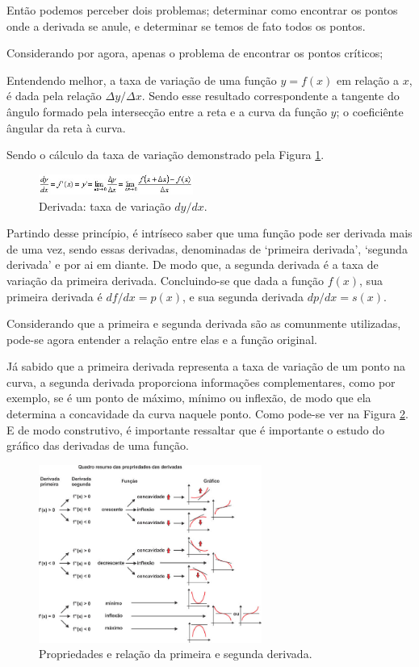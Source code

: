 Então podemos perceber dois problemas; determinar como encontrar os pontos onde
a derivada se anule, e determinar se temos de fato todos os pontos.

Considerando por agora, apenas o problema de encontrar os pontos críticos;

Entendendo melhor, a taxa de variação de uma função \(y=f(x)\) em relação a
\(x\), é dada pela relação \(\Delta y / \Delta x\). Sendo esse resultado
correspondente a tangente do ângulo formado pela intersecção entre a reta e a
curva da função \(y\); o coeficiênte ângular da reta à curva.

Sendo o cálculo da taxa de variação demonstrado pela Figura
\ref{derivada_padrao}.

\begin{figure}[h]
    \includegraphics[width=0.45\textwidth]
        {src/derivada_padrao.jpg}
    \centering
    \caption{Derivada: taxa de variação \(dy/dx\).}
    \label{derivada_padrao}
\end{figure}

Partindo desse princípio, é intríseco saber que uma função pode ser derivada
mais de uma vez, sendo essas derivadas, denominadas de `primeira derivada',
`segunda derivada' e por ai em diante. De modo que, a segunda derivada é
a taxa de variação da primeira derivada. Concluindo-se que dada a função
\(f(x)\), sua primeira derivada é \(df/dx = p(x)\), e sua segunda derivada
\(dp/dx = s(x)\).

Considerando que a primeira e segunda derivada são as comunmente utilizadas,
pode-se agora entender a relação entre elas e a função original.

Já sabido que a primeira derivada representa a taxa de variação de um ponto na
curva, a segunda derivada proporciona informações complementares, como por
exemplo, se é um ponto de máximo, mínimo ou inflexão, de modo que ela determina
a concavidade da curva naquele ponto. Como pode-se ver na Figura
\ref{relacao_primeira_segunda_derivada}. E de modo construtivo, é importante
ressaltar que é importante o estudo do gráfico das derivadas de uma função.

\begin{figure}[h]
    \includegraphics[width=0.65\textwidth]
        {src/relacao_primeira_segunda_derivada.jpg}
    \centering
    \caption{Propriedades e relação da primeira e segunda derivada.}
    \label{relacao_primeira_segunda_derivada}
\end{figure}


